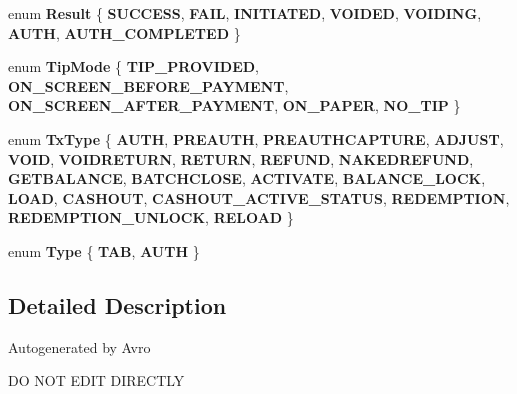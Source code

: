 \begin{DoxyCompactItemize}
enum {\bfseries Result} \{ \newline
{\bfseries S\+U\+C\+C\+E\+SS}, 
{\bfseries F\+A\+IL}, 
{\bfseries I\+N\+I\+T\+I\+A\+T\+ED}, 
{\bfseries V\+O\+I\+D\+ED}, 
\newline
{\bfseries V\+O\+I\+D\+I\+NG}, 
{\bfseries A\+U\+TH}, 
{\bfseries A\+U\+T\+H\+\_\+\+C\+O\+M\+P\+L\+E\+T\+ED}
 \}
\item 
\mbox{\label{namespacecom_1_1clover_1_1sdk_1_1v3_1_1payments_a64910d0166e294f61d8b27b0d4ef26db}} 
enum {\bfseries Tip\+Mode} \{ \newline
{\bfseries T\+I\+P\+\_\+\+P\+R\+O\+V\+I\+D\+ED}, 
{\bfseries O\+N\+\_\+\+S\+C\+R\+E\+E\+N\+\_\+\+B\+E\+F\+O\+R\+E\+\_\+\+P\+A\+Y\+M\+E\+NT}, 
{\bfseries O\+N\+\_\+\+S\+C\+R\+E\+E\+N\+\_\+\+A\+F\+T\+E\+R\+\_\+\+P\+A\+Y\+M\+E\+NT}, 
{\bfseries O\+N\+\_\+\+P\+A\+P\+ER}, 
\newline
{\bfseries N\+O\+\_\+\+T\+IP}
 \}
\item 
\mbox{\label{namespacecom_1_1clover_1_1sdk_1_1v3_1_1payments_ad4411d3ee4c0997584ff0df20764ba06}} 
enum {\bfseries Tx\+Type} \{ \newline
{\bfseries A\+U\+TH}, 
{\bfseries P\+R\+E\+A\+U\+TH}, 
{\bfseries P\+R\+E\+A\+U\+T\+H\+C\+A\+P\+T\+U\+RE}, 
{\bfseries A\+D\+J\+U\+ST}, 
\newline
{\bfseries V\+O\+ID}, 
{\bfseries V\+O\+I\+D\+R\+E\+T\+U\+RN}, 
{\bfseries R\+E\+T\+U\+RN}, 
{\bfseries R\+E\+F\+U\+ND}, 
\newline
{\bfseries N\+A\+K\+E\+D\+R\+E\+F\+U\+ND}, 
{\bfseries G\+E\+T\+B\+A\+L\+A\+N\+CE}, 
{\bfseries B\+A\+T\+C\+H\+C\+L\+O\+SE}, 
{\bfseries A\+C\+T\+I\+V\+A\+TE}, 
\newline
{\bfseries B\+A\+L\+A\+N\+C\+E\+\_\+\+L\+O\+CK}, 
{\bfseries L\+O\+AD}, 
{\bfseries C\+A\+S\+H\+O\+UT}, 
{\bfseries C\+A\+S\+H\+O\+U\+T\+\_\+\+A\+C\+T\+I\+V\+E\+\_\+\+S\+T\+A\+T\+US}, 
\newline
{\bfseries R\+E\+D\+E\+M\+P\+T\+I\+ON}, 
{\bfseries R\+E\+D\+E\+M\+P\+T\+I\+O\+N\+\_\+\+U\+N\+L\+O\+CK}, 
{\bfseries R\+E\+L\+O\+AD}
 \}
\item 
\mbox{\label{namespacecom_1_1clover_1_1sdk_1_1v3_1_1payments_ab3a3c9595b671a87b6fe5f1920784b73}} 
enum {\bfseries Type} \{ {\bfseries T\+AB}, 
{\bfseries A\+U\+TH}
 \}
\end{DoxyCompactItemize}


\subsection{Detailed Description}
Autogenerated by Avro

DO N\+OT E\+D\+IT D\+I\+R\+E\+C\+T\+LY 
